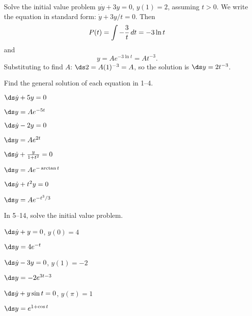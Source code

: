 \begin{example} Solve the initial value problem $y\dot y+3y=0$, $y(1)=2$,
assuming $t>0$. We
write the equation in standard form: $\dot y+3y/t=0$. Then
$$P(t)=\int -{3\over t}\,dt=-3\ln t$$
and 
$$ y=Ae^{-3\ln t}=At^{-3}.$$
Substituting to find $A$:
$\ds 2=A(1)^{-3}=A$, so the solution is $\ds y=2t^{-3}$.
\end{example}

\begin{exercises}

Find the general solution of each equation in 1--4.

\begin{exercise} $\ds\dot y+5y=0$
\begin{answer} $\ds y=Ae^{-5t}$
\end{answer}\end{exercise}

\begin{exercise} $\ds\dot y-2y=0$
\begin{answer} $\ds y=Ae^{2t}$
\end{answer}\end{exercise}

\begin{exercise} $\ds\dot y+{y\over 1+t^2}=0$
\begin{answer} $\ds y=Ae^{-\arctan t}$
\end{answer}\end{exercise}

\begin{exercise} $\ds\dot y+t^2y=0$
\begin{answer} $\ds y=Ae^{-t^3/3}$
\end{answer}\end{exercise}

In 5--14, solve the initial value problem.

\begin{exercise} $\ds\dot y + y=0$, $y(0)=4$
\begin{answer} $\ds y=4e^{-t}$
\end{answer}\end{exercise}

\begin{exercise} $\ds\dot y -3y=0$, $y(1)=-2$
\begin{answer} $\ds y=-2e^{3t-3}$
\end{answer}\end{exercise}

\begin{exercise} $\ds\dot y + y\sin t = 0$, $y(\pi)=1$
\begin{answer} $\ds y=e^{1+\cos t}$
\end{answer}\end{exercise}


\end{exercises}
